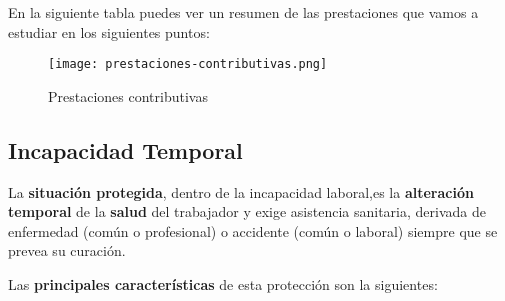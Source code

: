 En la siguiente tabla puedes ver un resumen de las prestaciones que vamos a estudiar en los siguientes puntos:

\begin{figure}[H]
    \centering
    \texttt{[image: prestaciones-contributivas.png]}
    \caption{Prestaciones contributivas}
\end{figure}

\subsection{Incapacidad Temporal}
La \textbf{situación protegida}, dentro de la incapacidad laboral,es la \textbf{alteración temporal} de la \textbf{salud} del trabajador y exige asistencia sanitaria, derivada de enfermedad (común o profesional) o accidente (común o laboral) siempre que se prevea su curación.

Las \textbf{principales características} de esta protección son la siguientes:


